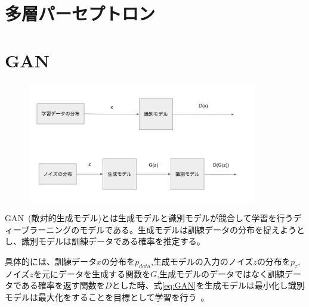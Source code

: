 \section{多層パーセプトロン}




\section{GAN}

\begin{figure}[h]
    \includegraphics[width=10.0cm]{figure/GAN.png}
\end{figure}

GAN~(敵対的生成モデル)とは生成モデルと識別モデルが競合して学習を行うディープラーニングのモデルである。生成モデルは訓練データの分布を捉えようとし、識別モデルは訓練データである確率を推定する。\par
具体的には、訓練データ$x$の分布を$p_{data}$,生成モデルの入力のノイズ$z$の分布を$p_z$,ノイズ$z$を元にデータを生成する関数を$G$,生成モデルのデータではなく訓練データである確率を返す関数を$D$とした時、式\ref{eq:GAN}を生成モデルは最小化し識別モデルは最大化をすることを目標として学習を行う~\cite{GAN}。


